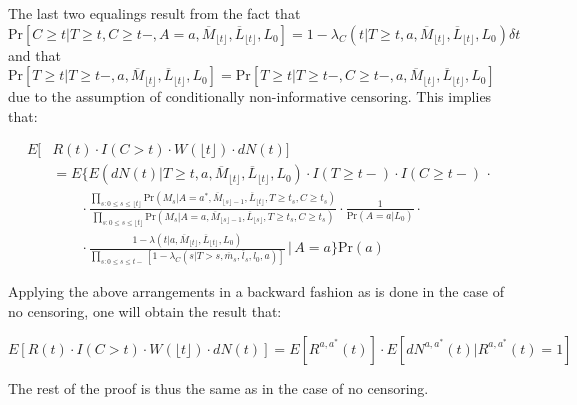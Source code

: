 \documentclass[AMA,STIX1COL]{WileyNJD-v2}
\newcommand{\pr}{\text{Pr}}
\begin{document}
The last two equalings result from the fact that $\pr\left[C\ge t|T\ge t,C\ge t-,A=a,\overline{M}_{\lfloor t \rfloor},\overline{L}_{\lfloor t \rfloor},L_0\right] = 1 - \lambda_C(t|T\ge t, a,\overline{M}_{\lfloor t \rfloor},\overline{L}_{\lfloor t \rfloor},L_0)\delta t$ and that $\pr[T\ge t|T\ge t-,a,\overline{M}_{\lfloor t \rfloor},\overline{L}_{\lfloor t \rfloor},L_0] =  \pr[T\ge t|T\ge t-,C\ge t-,a,\overline{M}_{\lfloor t \rfloor},\overline{L}_{\lfloor t \rfloor},L_0]$ due to the assumption of conditionally non-informative censoring. This implies that:

\begingroup
\fontsize{10pt}{10pt}\selectfont
\begin{align*}
E[&R(t)\cdot I(C>t)\cdot W(\lfloor t \rfloor) \cdot dN(t)]\\
&=E \biggl\{E(dN(t) | T\ge t, a,\overline{M}_{\lfloor t \rfloor},\overline{L}_{\lfloor t \rfloor}, L_{0})\cdot I(T\ge t-)\cdot I(C\ge t-)\, \cdot \nonumber\\
&\quad\quad\cdot \frac{\prod_{s: 0\le s \le \lfloor t \rfloor} \pr(M_{s}|A = a^*, \overline{M}_{\lfloor s \rfloor-1}, \overline{L}_{\lfloor t \rfloor}, T\ge t_s, C \ge t_s)}{\prod_{s: 0\le s \le \lfloor t \rfloor} \pr(M_{s}|A = a, \overline{M}_{\lfloor s\rfloor-1}, \overline{L}_{\lfloor s \rfloor}, T\ge t_s, C \ge t_s)}\cdot \frac{1}{\pr(A=a|L_{0})}\cdot\\
&\quad\quad\cdot \frac{1-\lambda(t|a,\overline{M}_{\lfloor t \rfloor},\overline{L}_{\lfloor t \rfloor},L_0)}{\prod_{s: 0\le s \le t-} \left[1- \lambda_C(s|T>s, \overline{m}_{s }, \overline{l}_{s},l_{0},a)\right]} \,\bigg\rvert\, A=a\biggr\}\pr(a)
\end{align*}
\endgroup

Applying the above arrangements in a backward fashion as is done in the case of no censoring, one will obtain the result that:

\begingroup
\fontsize{10pt}{10pt}\selectfont
\[E[R(t)\cdot I(C>t)\cdot W(\lfloor t \rfloor) \cdot dN(t)]=E\left[R^{a,a^*}(t)\right]\cdot  E\left[dN^{a,a^*}(t)|R^{a,a^*}(t)=1\right]\] 
\endgroup

The rest of the proof is thus the same as in the case of no censoring.



\clearpage
\end{document}
